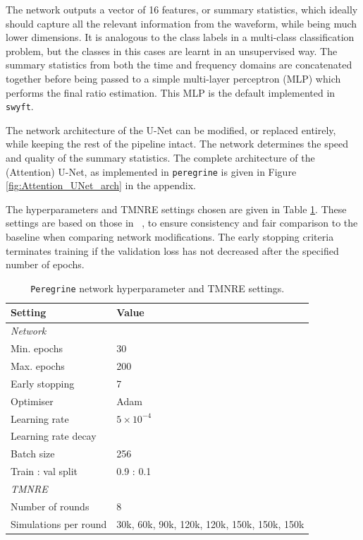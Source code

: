 The network outputs a vector of 16 features, or summary statistics, which ideally should capture all the relevant information from the waveform, while being much lower dimensions. It is analogous to the class labels in a multi-class classification problem, but the classes in this cases are learnt in an unsupervised way. The summary statistics from both the time and frequency domains are concatenated together before being passed to a simple multi-layer perceptron (MLP) which performs the final ratio estimation. This MLP is the default implemented in \texttt{swyft}.

The network architecture of the U-Net can be modified, or replaced entirely, while keeping the rest of the pipeline intact. The network determines the speed and quality of the summary statistics. The complete architecture of the (Attention) U-Net, as implemented in \texttt{peregrine} is given in Figure \ref{fig:Attention_UNet_arch} in the appendix.

The hyperparameters and TMNRE settings chosen are given in Table \ref{tab:default_run_settings}. These settings are based on those in ~\cite{bhardwaj2023peregrine}, to ensure consistency and fair comparison to the baseline when comparing network modifications. The early stopping criteria terminates training if the validation loss has not decreased after the specified number of epochs.



\begin{table}
    \centering
    \caption{\texttt{Peregrine} network hyperparameter and TMNRE settings.}
    \label{tab:default_run_settings}
    \begin{tabular}{ll}
         \toprule
         \textbf{Setting}  & 
         \textbf{Value} \\
         \midrule
         \textit{Network} & \\
         Min. epochs & 30 \\
         Max. epochs & 200 \\
         Early stopping & 7 \\
         Optimiser & Adam \\
         Learning rate & $5\times10^{-4}$\\
         Learning rate decay & \\
         Batch size & 256\\
         Train : val split & 0.9 : 0.1\\
         \midrule
         \textit{TMNRE} & \\
         Number of rounds & 8 \\
         Simulations per round & \multicolumn{1}{p{4cm}}{\raggedright 30k, 60k, 90k, 120k, 120k, 150k, 150k, 150k} \\
         \bottomrule
    \end{tabular}
\end{table}

